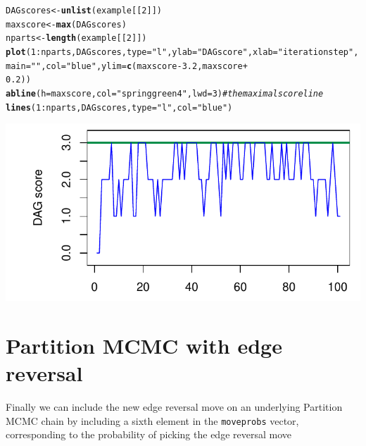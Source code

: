 \documentclass[a4paper]{article}\usepackage[]{graphicx}\usepackage[]{color}
\makeatletter
\def\maxwidth{ %
  \ifdim\Gin@nat@width>\linewidth
    \linewidth
  \else
    \Gin@nat@width
  \fi
}
\newcommand{\hlnum}[1]{\textcolor[rgb]{0.686,0.059,0.569}{#1}}%
\newcommand{\hlstr}[1]{\textcolor[rgb]{0.192,0.494,0.8}{#1}}%
\newcommand{\hlcom}[1]{\textcolor[rgb]{0.678,0.584,0.686}{\textit{#1}}}%
\newcommand{\hlopt}[1]{\textcolor[rgb]{0,0,0}{#1}}%
\newcommand{\hlstd}[1]{\textcolor[rgb]{0.345,0.345,0.345}{#1}}%
\newcommand{\hlkwb}[1]{\textcolor[rgb]{0.69,0.353,0.396}{#1}}%
\newcommand{\hlkwc}[1]{\textcolor[rgb]{0.333,0.667,0.333}{#1}}%
\newcommand{\hlkwd}[1]{\textcolor[rgb]{0.737,0.353,0.396}{\textbf{#1}}}%
\newenvironment{kframe}{%
 \def\at@end@of@kframe{}%
 \ifinner\ifhmode%
  \def\at@end@of@kframe{\end{minipage}}%
  \begin{minipage}{\columnwidth}%
 \fi\fi%
 \def\FrameCommand##1{\hskip\@totalleftmargin \hskip-\fboxsep
 \colorbox{shadecolor}{##1}\hskip-\fboxsep
     \hskip-\linewidth \hskip-\@totalleftmargin \hskip\columnwidth}%
 \MakeFramed {\advance\hsize-\width
   \@totalleftmargin\z@ \linewidth\hsize
   \@setminipage}}%
 {\par\unskip\endMakeFramed%
 \at@end@of@kframe}
\newenvironment{knitrout}{}{} %
\newcommand{\nn}{\noindent}
\makeatother
\begin{document}
\begin{knitrout}
\color{fgcolor}\begin{kframe}
\begin{alltt}
\hlstd{DAGscores} \hlkwb{<-} \hlkwd{unlist}\hlstd{(example[[}\hlnum{2}\hlstd{]])}
\hlstd{maxscore} \hlkwb{<-} \hlkwd{max}\hlstd{(DAGscores)}
\hlstd{nparts} \hlkwb{<-} \hlkwd{length}\hlstd{(example[[}\hlnum{2}\hlstd{]])}
\hlkwd{plot}\hlstd{(}\hlnum{1}\hlopt{:}\hlstd{nparts, DAGscores,} \hlkwc{type} \hlstd{=} \hlstr{"l"}\hlstd{,} \hlkwc{ylab} \hlstd{=} \hlstr{"DAG score"}\hlstd{,} \hlkwc{xlab} \hlstd{=} \hlstr{"iteration step"}\hlstd{,}
    \hlkwc{main} \hlstd{=} \hlstr{""}\hlstd{,} \hlkwc{col} \hlstd{=} \hlstr{"blue"}\hlstd{,} \hlkwc{ylim} \hlstd{=} \hlkwd{c}\hlstd{(maxscore} \hlopt{-} \hlnum{3.2}\hlstd{, maxscore} \hlopt{+}
        \hlnum{0.2}\hlstd{))}
\hlkwd{abline}\hlstd{(}\hlkwc{h} \hlstd{= maxscore,} \hlkwc{col} \hlstd{=} \hlstr{"springgreen4"}\hlstd{,} \hlkwc{lwd} \hlstd{=} \hlnum{3}\hlstd{)}  \hlcom{# the maximal score line}
\hlkwd{lines}\hlstd{(}\hlnum{1}\hlopt{:}\hlstd{nparts, DAGscores,} \hlkwc{type} \hlstd{=} \hlstr{"l"}\hlstd{,} \hlkwc{col} \hlstd{=} \hlstr{"blue"}\hlstd{)}
\end{alltt}
\end{kframe}

{\centering \includegraphics[width=\maxwidth]{figure/minimal-unnamed-chunk-21-1} 

}



\end{knitrout}

\section{Partition MCMC with edge reversal}

\nn Finally we can include the new edge reversal move on an underlying Partition MCMC chain by including a sixth element in the \texttt{moveprobs} vector, corresponding to the probability of picking the edge reversal move
\end{document}
